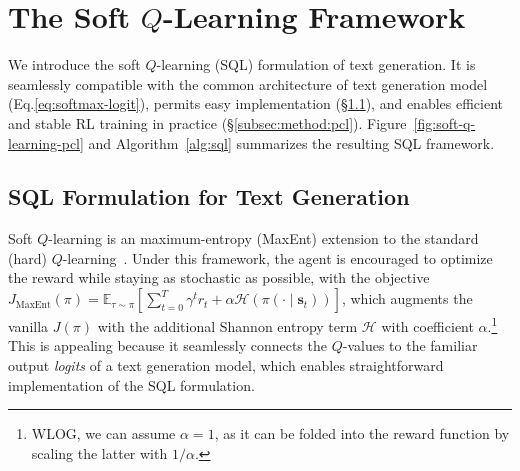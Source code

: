 \section{The Soft $Q$-Learning Framework}


We introduce the soft $Q$-learning (SQL) formulation of text generation. It is seamlessly compatible with the common architecture of text generation model (Eq.\ref{eq:softmax-logit}), permits easy implementation (\S\ref{sec:sql-formulation}),
and enables efficient and stable RL training in practice (\S\ref{subsec:method:pcl}).
Figure~\ref{fig:soft-q-learning-pcl} and Algorithm~\ref{alg:sql} summarizes the resulting SQL framework.




\subsection{SQL Formulation for Text Generation}\label{sec:sql-formulation}

Soft $Q$-learning \citep{haarnoja2017reinforcement,schulman2017equivalence,nachum2017bridging} is an maximum-entropy (MaxEnt) extension to the standard (hard) $Q$-learning~\citep{mnih2015human,sutton2018reinforcement}. Under this framework, the agent is encouraged to optimize the reward while staying as stochastic as possible, with the objective
$J_{\text{MaxEnt}}(\pi)=\mathbb{E}_{\tau \sim \pi}\left[\sum_{t=0}^T \gamma^t r_t + \alpha \mathcal{H}\left(\pi\left(\cdot \mid \bm{s}_{t}\right)\right)\right]$,
which augments the vanilla $J(\pi)$
with the additional Shannon entropy term $\mathcal{H}$ with coefficient $\alpha$.\footnote{WLOG, we can assume $\alpha{=}1$, as it can be folded into the reward function by scaling the latter with $1/\alpha$.}
This is appealing because it seamlessly connects the $Q$-values to the familiar output \textit{logits} of a text generation model, which enables straightforward implementation of the SQL formulation.

